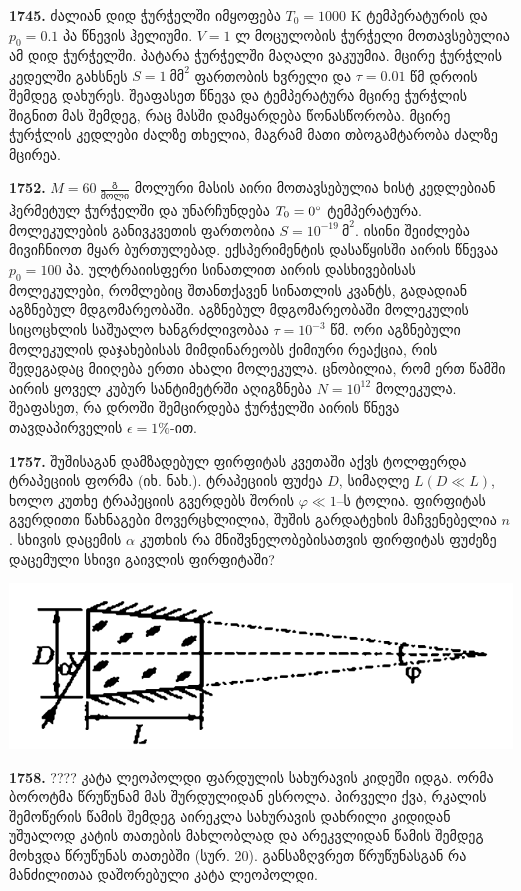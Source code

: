 \documentclass[12pt,a4paper,]{report}
\begin{document}
\textbf{1745.} ძალიან დიდ ჭურჭელში იმყოფება $T_0=1000$ K ტემპერატურის და $p_0=0.1$ პა წნევის ჰელიუმი. $V=1$ ლ მოცულობის ჭურჭელი მოთავსებულია ამ დიდ ჭურჭელში. პატარა ჭურჭელში მაღალი ვაკუუმია. მცირე ჭურჭლის კედელში გახსნეს $S=1\ \text{მმ}^2$ ფართობის ხვრელი და $\tau=0.01$ წმ დროის შემდეგ დახურეს. შეაფასეთ წნევა და ტემპერატურა მცირე ჭურჭლის შიგნით მას შემდეგ, რაც მასში დამყარდება წონასწორობა. მცირე ჭურჭლის კედლები ძალზე თხელია, მაგრამ მათი თბოგამტარობა ძალზე მცირეა.  

\textbf{1752.} $M = 60\ \frac{\text{გ}}{\text{მოლი}}$ მოლური მასის აირი მოთავსებულია ხისტ კედლებიან ჰერმეტულ ჭურჭელში და უნარჩუნდება $T_0 = 0 \degree$ ტემპერატურა. მოლეკულების განივკვეთის ფართობია $S = 10^{-19}\ \text{მ}^2$. ისინი შეიძლება მივიჩნიოთ მყარ ბურთულებად. ექსპერიმენტის დასაწყისში აირის წნევაა $p_0 = 100$ პა. ულტრაიისფერი სინათლით აირის დასხივებისას მოლეკულები, რომლებიც შთანთქავენ სინათლის კვანტს, გადადიან აგზნებულ მდგომარეობაში. აგზნებულ მდგომარეობაში მოლეკულის სიცოცხლის საშუალო ხანგრძლივობაა $\tau = 10^{-3}$ წმ. ორი აგზნებული მოლეკულის დაჯახებისას მიმდინარეობს ქიმიური რეაქცია, რის შედეგადაც მიიღება ერთი ახალი მოლეკულა. ცნობილია, რომ ერთ წამში აირის ყოველ კუბურ სანტიმეტრში აღიგზნება $N = 10^{12}$ მოლეკულა. შეაფასეთ, რა დროში შემცირდება ჭურჭელში აირის წნევა თავდაპირველის $\epsilon = 1 \%$-ით.

\textbf{1757.} შუშისაგან დამზადებულ ფირფიტას კვეთაში აქვს ტოლფერდა ტრაპეციის ფორმა (იხ. ნახ.). ტრაპეციის ფუძეა $D$, სიმაღლე $L (D\ll L)$, ხოლო კუთხე ტრაპეციის გვერდებს შორის $\varphi \ll 1$–ს ტოლია. ფირფიტას გვერდითი წახნაგები მოვერცხლილია, შუშის გარდატეხის მაჩვენებელია $n$. სხივის დაცემის $\alpha$ კუთხის რა მნიშვნელობებისათვის ფირფიტას ფუძეზე დაცემული სხივი გაივლის ფირფიტაში?
		\begin{center}
			\includegraphics[scale=0.4]{images/F1757.png}
		\end{center}

\textbf{1758.} ???? კატა ლეოპოლდი ფარდულის სახურავის კიდეში იდგა. ორმა ბოროტმა წრუწუნამ მას შურდულიდან ესროლა. პირველი ქვა, რკალის შემოწერის წამის შემდეგ აირეკლა სახურავის დახრილი კიდიდან უშუალოდ კატის თათების მახლობლად და არეკვლიდან    წამის შემდეგ მოხვდა წრუწუნას თათებში (სურ. 20). განსაზღვრეთ წრუწუნასგან რა   მანძილითაა დაშორებული კატა ლეოპოლდი.                        
\end{document}
